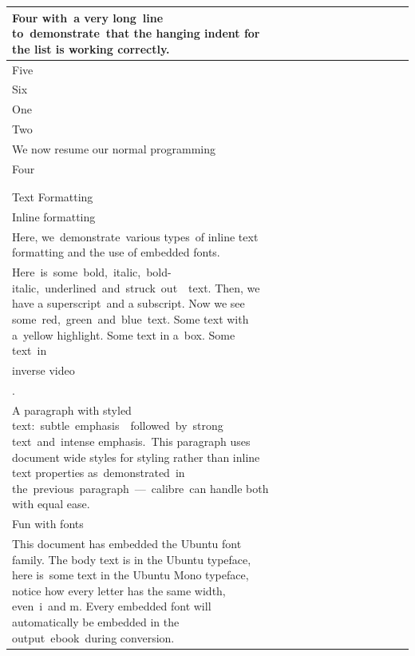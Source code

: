 \documentclass[\officeparserdriver 11pt]{article}
\begin{document}
{\begin{longtable}{|*{13}{>{\raggedright\arraybackslash}p{\dimexpr(\linewidth-26\tabcolsep-14\arrayrulewidth)/13\relax}|}}
\hline
Four with~a very long~line to~demonstrate~that the hanging indent for the list is working correctly.~ &  &  &  &  &  &  &  &  &  &  &  &  \\
\hline
Five~ &  &  &  &  &  &  &  &  &  &  &  &  \\
\hline
Six~ &  &  &  &  &  &  &  &  &  &  &  &  \\
\hline
One~ &  &  &  &  &  &  &  &  &  &  &  &  \\
\hline
Two~ &  &  &  &  &  &  &  &  &  &  &  &  \\
\hline
We now resume our normal programming~ &  &  &  &  &  &  &  &  &  &  &  &  \\
\hline
Four~ &  &  &  &  &  &  &  &  &  &  &  &  \\
\hline
 &  &  &  &  &  &  &  &  &  &  &  &  \\
\hline
 &  &  &  &  &  &  &  &  &  &  &  &  \\
\hline
Text Formatting~ &  &  &  &  &  &  &  &  &  &  &  &  \\
\hline
Inline formatting~ &  &  &  &  &  &  &  &  &  &  &  &  \\
\hline
Here, we~demonstrate~various types~of inline text formatting and the use of embedded fonts.~ &  &  &  &  &  &  &  &  &  &  &  &  \\
\hline
Here~is~some~bold,~italic,~bold-italic,~underlined~and~struck~out~~text. Then, we have a superscript~and a subscript. Now we see some~red,~green~and~blue~text. Some text with a~yellow highlight. Some text in a~box. Some text~in~ &  &  &  &  &  &  &  &  &  &  &  &  \\
\hline
inverse video &  &  &  &  &  &  &  &  &  &  &  &  \\
\hline
. &  &  &  &  &  &  &  &  &  &  &  &  \\
\hline
A paragraph with styled text:~subtle~emphasis~~followed~by~strong text~and~intense emphasis.~This paragraph uses document wide styles for styling rather than inline text properties as~demonstrated~in the~previous~paragraph~—~calibre~can handle both with equal ease.~ &  &  &  &  &  &  &  &  &  &  &  &  \\
\hline
Fun with fonts~ &  &  &  &  &  &  &  &  &  &  &  &  \\
\hline
This document has embedded the Ubuntu font family. The body text is in the Ubuntu typeface, here is~some text in the Ubuntu Mono typeface, notice how every letter has the same width, even~i~and m. Every embedded font will automatically be embedded in the output~ebook~during conversion.~~ &  &  &  &  &  &  &  &  &  &  &  &  \\

\end{longtable}}
\end{document}
